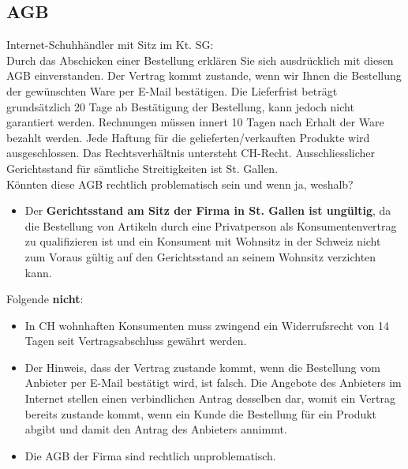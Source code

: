 \subsection{AGB}
Internet-Schuhhändler mit Sitz im Kt. SG:\\
Durch das Abschicken einer Bestellung erklären Sie sich ausdrücklich mit diesen AGB einverstanden. Der Vertrag kommt zustande, wenn wir Ihnen die Bestellung der gewünschten Ware per E-Mail bestätigen. Die Lieferfrist beträgt grundsätzlich 20 Tage ab Bestätigung der Bestellung, kann jedoch nicht garantiert werden. Rechnungen müssen innert 10 Tagen nach Erhalt der Ware bezahlt werden. Jede Haftung für die gelieferten/verkauften Produkte wird ausgeschlossen. Das Rechtsverhältnis untersteht CH-Recht. Ausschliesslicher Gerichtsstand für sämtliche Streitigkeiten ist St. Gallen.\\
Könnten diese AGB rechtlich problematisch sein und wenn ja, weshalb?
\begin{itemize}
	\item Der \textbf{Gerichtsstand am Sitz der Firma in St. Gallen ist ungültig}, da die Bestellung von Artikeln durch eine Privatperson als Konsumentenvertrag zu qualifizieren ist und ein Konsument mit Wohnsitz in der Schweiz nicht zum Voraus gültig auf den Gerichtsstand an seinem Wohnsitz verzichten kann.
\end{itemize}
\begin{Large}
	Folgende \textbf{nicht}:
\end{Large}
\begin{itemize}
	\item In CH wohnhaften Konsumenten muss zwingend ein Widerrufsrecht von 14 Tagen seit Vertragsabschluss gewährt werden.
	\item Der Hinweis, dass der Vertrag zustande kommt, wenn die Bestellung vom Anbieter per E-Mail bestätigt wird, ist falsch. Die Angebote des Anbieters im Internet stellen einen verbindlichen Antrag desselben dar, womit ein Vertrag bereits zustande kommt, wenn ein Kunde die Bestellung für ein Produkt abgibt und damit den Antrag des Anbieters annimmt.
	\item Die AGB der Firma sind rechtlich unproblematisch.
\end{itemize}

